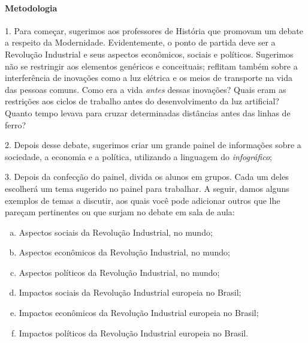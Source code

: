 \documentclass[11pt]{extarticle}
\begin{document}
\paragraph{Metodologia}

1. Para começar, sugerimos aos professores de História que promovam um
debate a respeito da Modernidade. Evidentemente, o ponto de partida deve
ser a Revolução Industrial e seus aspectos econômicos, sociais e
políticos. Sugerimos não se restringir aos elementos genéricos e
conceituais; reflitam também sobre a interferência de inovações como a
luz elétrica e os meios de transporte na vida das pessoas comuns. Como
era a vida \emph{antes} dessas inovações? Quais eram as restrições aos
ciclos de trabalho antes do desenvolvimento da luz artificial? Quanto
tempo levava para cruzar determinadas distâncias antes das linhas de
ferro?

\vspace{3mm}

2. Depois desse debate, sugerimos criar um grande painel de informações
sobre a sociedade, a economia e a política, utilizando a linguagem do
\emph{infográfico};


3. Depois da confecção do painel, divida os alunos em grupos. Cada um
deles escolherá um tema sugerido no painel para trabalhar. A seguir,
damos alguns exemplos de temas a discutir, aos quais você pode adicionar
outros que lhe pareçam pertinentes ou que surjam no debate em sala de
aula:

\begin{enumerate}[(a)]  

\item Aspectos sociais da Revolução Industrial, no mundo;

\item Aspectos econômicos da Revolução Industrial, no mundo;

\item Aspectos políticos da Revolução Industrial, no mundo;

\item Impactos sociais da Revolução Industrial europeia no Brasil;

\item Impactos econômicos da Revolução Industrial europeia no Brasil;

\item Impactos políticos da Revolução Industrial europeia no Brasil.

\end{enumerate} 
\end{document}
